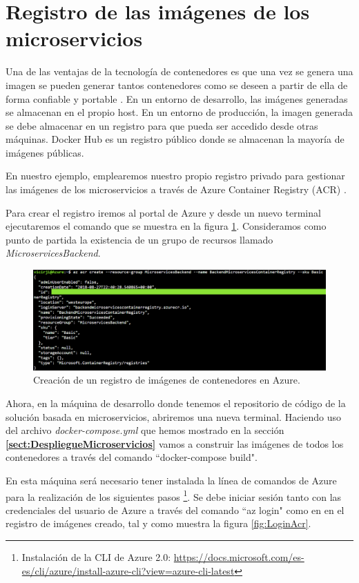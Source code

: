 \documentclass[11pt,spanish,listoffigures]{tfgetsinf}
\begin{document}
\section{Registro de las imágenes de los microservicios}

Una de las ventajas de la tecnología de contenedores es que una vez se genera una imagen se pueden generar tantos contenedores como se deseen a partir de ella de forma confiable y portable \cite{Matthias}. En un entorno de desarrollo, las imágenes generadas se almacenan en el propio host. En un entorno de producción, la imagen generada se debe almacenar en un registro para que pueda ser accedido desde otras máquinas. Docker Hub es un registro público donde se almacenan la mayoría de imágenes públicas.

En nuestro ejemplo, emplearemos nuestro propio registro privado para gestionar las imágenes de los microservicios a través de Azure Container Registry (ACR) \cite{DelaTorre2018}.

Para crear el registro iremos al portal de Azure y desde un nuevo terminal ejecutaremos el comando que se muestra en la figura \ref{fig:CreateACR}. Consideramos como punto de partida la existencia de un grupo de recursos llamado \textit{MicroservicesBackend}.

\begin{figure}[h]
\centering
\includegraphics[scale=0.50]{CreateACR}
\caption{Creación de un registro de imágenes de contenedores en Azure.}
\label{fig:CreateACR}
\end{figure}

Ahora, en la máquina de desarrollo donde tenemos el repositorio de código de la solución basada en microservicios, abriremos una nueva terminal. Haciendo uso del archivo \textit{docker-compose.yml} que hemos mostrado en la sección \textbf{\ref{sect:DespliegueMicroservicios} } vamos a construir las imágenes de todos los contenedores a través del comando ``docker-compose build".

En esta máquina será necesario tener instalada la línea de comandos de Azure para la realización de los siguientes pasos \footnote{ Instalación de la CLI de Azure 2.0: \url{https://docs.microsoft.com/es-es/cli/azure/install-azure-cli?view=azure-cli-latest}}. Se debe iniciar sesión tanto con las credenciales del usuario de Azure a través del comando ``az login" como en en el registro de imágenes creado, tal y como muestra la figura \ref{fig:LoginAcr}.
\end{document}
